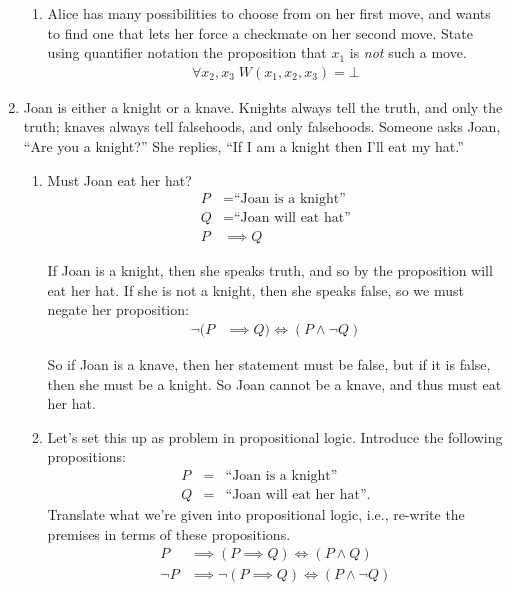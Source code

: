 \documentclass[11pt,fleqn]{article}
\begin{document}
\begin{enumerate}
\begin{enumerate}
\item Alice has many possibilities to choose from on her first move,
and wants to find one that lets her force a checkmate on her second move.
State using quantifier notation the proposition that $x_1$
is \emph{not} such a move.
\begin{align}
\forall x_2, x_3\; W(x_1, x_2, x_3) = \bot
\end{align}

\end{enumerate}

\item
Joan is either a knight or a knave.
Knights always tell the truth, and only the truth;
knaves always tell falsehoods, and only falsehoods.
Someone asks Joan, ``Are you a knight?''  She replies,
``If I am a knight then I'll eat my hat.''
\begin{enumerate}
\item Must Joan eat her hat?
\begin{align}
  P &= \text{``Joan is a knight''}\\
  Q &= \text{``Joan will eat hat''}\\
  P &\implies Q
\end{align}

If Joan is a knight, then she speaks truth, and so by the proposition will eat her hat.  If she is not a knight, then she speaks false, so we must negate her proposition:
\begin{align}
  \lnot (P &\implies Q) \iff (P \land \lnot Q)
\end{align}

So if Joan is a knave, then her statement must be false, but if it is false, then she must be a knight.  So Joan cannot be a knave, and thus must eat her hat.

\item Let's set this up as problem in propositional logic.
Introduce the following propositions:
\begin{eqnarray}
P &=& \text{``Joan is a knight''}\\
Q &=& \text{``Joan will eat her hat''}.
\end{eqnarray}
Translate what we're given into propositional logic,
i.e., re-write the premises in terms of these propositions.
\begin{align}
  P &\implies (P \implies Q) \iff (P \land Q)\\
  \lnot P &\implies \lnot (P \implies Q) \iff (P \land \lnot Q)
\end{align}


\end{enumerate}
\end{enumerate}
\end{document}
